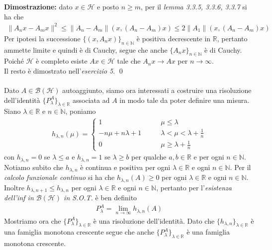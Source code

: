 \documentclass{article}
\numberwithin{equation}{subsection}
\begin{document}
\textbf{Dimostrazione:} dato $x \in \mathcal{H}$ e posto $n \geq m$, per il \textit{lemma 3.3.5, 3.3.6, 3.3.7} si ha che
\begin{align*}
    \|A_nx - A_mx\|^2 \leq \|A_n - A_m\|(x, (A_n - A_m)x) \leq 2\|A_1\|(x, (A_n - A_m)x) 
\end{align*}
Per ipotesi la successione $\{(x, A_nx)\}_{n \in \mathbb{N}}$ è positiva decrescente in $\mathbb{R}$, pertanto ammette limite e quindi è di Cauchy, segue che anche $\{A_nx\}_{n \in \mathbb{N}}$ è di Cauchy. Poiché $\mathcal{H}$ è completo esiste $Ax \in \mathcal{H}$ tale che $A_nx \rightarrow Ax$ per $n \rightarrow \infty$. \\
Il resto è dimostrato nell'\textit{esercizio 5}. \qed \\ \\
Dato $A \in \mathcal{B}(\mathcal{H})$ autoaggiunto, siamo ora interessati a costruire una risoluzione dell'identità $\{P^A_\lambda\}_{\lambda \in \mathbb{R}}$ associata ad $A$ in modo tale da poter definire una misura. Siano $\lambda \in \mathbb{R}$ e $n \in \mathbb{N}$, poniamo 
\begin{align*}
    h_{\lambda, n}(\mu) = \begin{cases}
        1 \qquad &\mu \leq \lambda \\
        -n\mu + n\lambda + 1 \qquad &\lambda < \mu < \lambda + \frac{1}{n} \\
        0 \qquad &\mu \geq \lambda + \frac{1}{n}
    \end{cases} 
\end{align*}
con $h_{\lambda, n} = 0$ se $\lambda \leq a$ e $h_{\lambda, n} = 1$ se $\lambda \geq b$ per qualche $a, b \in \mathbb{R}$ e per ogni $n \in \mathbb{N}$. \\
Notiamo subito che $h_{\lambda, n}$ è continua e positiva per ogni $\lambda \in \mathbb{R}$ e ogni $n \in \mathbb{N}$. Per il \textit{calcolo funzionale continuo} si ha che $h_{\lambda, n}(A) \geq 0$ per ogni $\lambda \in \mathbb{R}$ e ogni $n \in \mathbb{N}$. Inoltre $h_{\lambda, n + 1} \leq h_{\lambda, n}$ per ogni $\lambda \in \mathbb{R}$ e ogni $n \in \mathbb{N}$, pertanto per l'\textit{esistenza dell'inf in $\mathcal{B}(\mathcal{H})$ in S.O.T.} è ben definito 
\begin{align*}
    P^A_\lambda = \lim_{n \rightarrow \infty}h_{\lambda, n}(A) 
\end{align*}
Mostriamo ora che $\{P^A_\lambda\}_{\lambda \in \mathbb{R}}$ è una risoluzione dell'identità. Dato che $\{h_{\lambda, n}\}_{\lambda \in \mathbb{R}}$ è una famiglia monotona crescente segue che anche $\{P^A_\lambda\}_{\lambda \in \mathbb{R}}$ è una famiglia monotona crescente. \\ 
\end{document}
